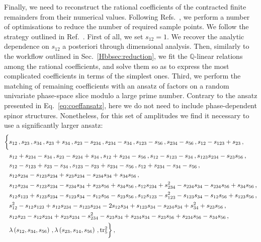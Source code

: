 \documentclass[main.tex]{subfiles}
\begin{document}
Finally, we need to reconstruct the rational coefficients of the contracted finite remainders from their numerical values. Following Refs.~\cite{Abreu:2018zmy,Badger:2021nhg,Badger:2021imn,Badger:2021ega}, we perform a number of optimisations to reduce the number of required sample points. We follow the strategy outlined in Ref.~\cite{Badger:2021imn}. First of all, we set $s_{12}=1$. We recover the analytic dependence on $s_{12}$ a posteriori through dimensional analysis. Then, similarly to the workflow outlined in Sec.~\ref{Hbbsec:reduction}, we fit the $\mathbb{Q}$-linear relations among the rational coefficients, and solve them so as to express the most complicated coefficients in terms of the simplest ones. Third, we perform the matching of remaining coefficients with an ansatz of factors on a random univariate phase-space slice modulo a large prime number. Contrary to the ansatz presented in Eq.~\ref{eq:coeffansatz}, here we do not need to include phase-dependent spinor structures. Nonetheless, for this set of amplitudes we find it necessary to use a significantly larger ansatz:
\begin{align} \label{Wyjeq:coeffansatz}
\begin{aligned} 
\biggl\{ & s_{12}\,, s_{23}\,, s_{34}\,, s_{23} + s_{34}\,, s_{23} - s_{234}\,, s_{234} - s_{34}\,, s_{123} - s_{56}\,, s_{234} - s_{56}\,, s_{12} - s_{123} + s_{23}\,, \\
& s_{12} + s_{234} - s_{34} \,, s_{23} - s_{234} + s_{34}\,, s_{12} + s_{234} - s_{56}\,, s_{12} - s_{123} - s_{34}\,, s_{123} s_{234} - s_{23} s_{56}\,, \\
& s_{12} - s_{123} + s_{23} - s_{34} \,, s_{123} - s_{23} + s_{234} - s_{56} \,, s_{12} + s_{234} - s_{34} - s_{56} \,, \\
& s_{12} s_{234} - s_{123} s_{234} + s_{23} s_{234} - s_{234} s_{34} + s_{34} s_{56} \,, \\
& s_{12} s_{234} - s_{123} s_{234} - s_{234} s_{34} + s_{23} s_{56} + s_{34} s_{56} \,, s_{12} s_{234} + s_{234}^2 - s_{234} s_{34} - s_{234} s_{56} + s_{34} s_{56} \,, \\
& s_{12} s_{123} + s_{123} s_{234} - s_{123} s_{34} - s_{12} s_{56} - s_{23} s_{56} \,, s_{12} s_{123} - s_{123}^2 - s_{123} s_{34} - s_{12} s_{56} + s_{123} s_{56} \,, \\
& s_{12}^2 - s_{12} s_{123} + s_{12} s_{234} - s_{123} s_{234} - 2 s_{12} s_{34} + s_{123} s_{34} - s_{234} s_{34} + s_{34}^2 + s_{23} s_{56} \,, \\
& s_{12} s_{23} - s_{12} s_{234} + s_{23} s_{234} - s_{234}^2 - s_{23} s_{34} + s_{234} s_{34} - s_{23} s_{56} + s_{234} s_{56} - s_{34} s_{56} \,, \\
& \lambda\left(s_{12}, s_{34}, s_{56} \right) \,, \lambda\left(s_{23}, s_{14}, s_{56}\right) \,, \operatorname{\rm tr}_5^2 \biggr\} \,,
\end{aligned}
\end{align}
\end{document}
